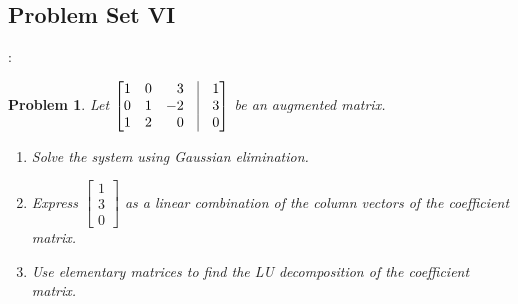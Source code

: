 \documentclass{article}
\theoremstyle{mystyle}
\newtheorem{problem}{Problem}[section]
\begin{document}
\subsection{Problem Set VI}:
\begin{problem}
Let $\begin{bmatrix*}[r] 1 & 0 & 3 & \vline & 1 \\ 0 & 1 & -2 & \vline & 3 \\ 1 & 2 & 0 & \vline & 0 \end{bmatrix*}$ be an augmented matrix.
\begin{enumerate}
    \item Solve the system using Gaussian elimination.
    \item Express $\begin{bmatrix} 1 \\ 3 \\ 0\end{bmatrix}$ as a linear combination of the column vectors of the coefficient matrix.
    \item Use elementary matrices to find the LU decomposition of the coefficient matrix.
\end{enumerate}
\end{problem}
\end{document}

